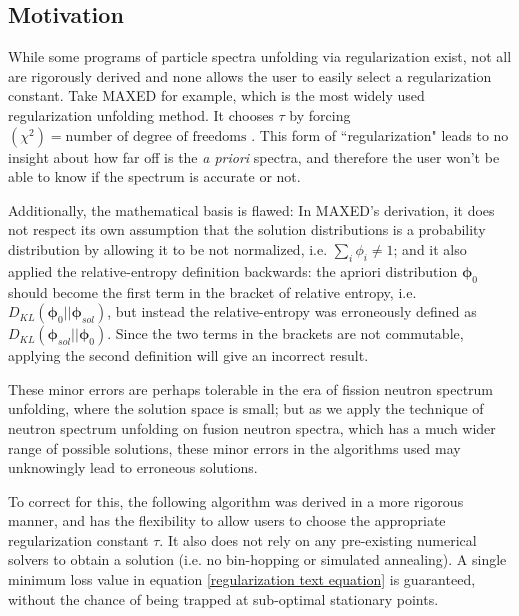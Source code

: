 \documentclass[a4paper, 12pt]{article}
\newcommand{\ve}[1]{\boldsymbol{#1}}
\newcommand{\apriori}[0]{\textit{a priori} }
\begin{document}
\subsection{Motivation}\label{motivation}
    While some programs of particle spectra unfolding via regularization exist, not all are rigorously derived and none allows the user to easily select a regularization constant. Take MAXED for example, which is the most widely used regularization unfolding method\cite{UnfoldingSuiteReview}. It chooses $\tau$ by forcing $(\chi^2) = \text{number of degree of freedoms}$ \cite{M.Reginatto-et-al2002-MAXED}. This form of ``regularization" leads to no insight about how far off is the \apriori spectra, and therefore the user won't be able to know if the spectrum is accurate or not.

    Additionally, the mathematical basis is flawed: In MAXED's derivation, it does not respect its own assumption that the solution distributions is a probability distribution by allowing it to be not normalized, i.e. $\sum\limits_i{\phi_i}\neq1$; and it also applied the relative-entropy definition backwards: the apriori distribution $\ve{\phi}_0$ should become the first term in the bracket of relative entropy, i.e. $D_{KL}(\ve{\phi}_0||\ve{\phi}_{sol})$, but instead the relative-entropy was erroneously defined as $D_{KL}(\ve{\phi}_{sol}||\ve{\phi}_0)$. Since the two terms in the brackets are not commutable, applying the second definition will give an incorrect result.

    These minor errors are perhaps tolerable in the era of fission neutron spectrum unfolding, where the solution space is small; but as we apply the technique of neutron spectrum unfolding on fusion neutron spectra, which has a much wider range of possible solutions, these minor errors in the algorithms used may unknowingly lead to erroneous solutions.

    To correct for this, the following algorithm was derived in a more rigorous manner, and has the flexibility to allow users to choose the appropriate regularization constant $\tau$. It also does not rely on any pre-existing numerical solvers to obtain a solution (i.e. no bin-hopping or simulated annealing). A single minimum loss value in equation \ref{regularization text equation} is guaranteed, without the chance of being trapped at sub-optimal stationary points.
    
\end{document}

